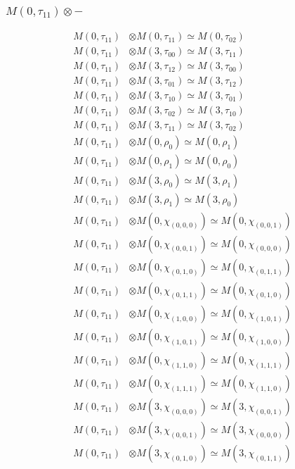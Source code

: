 \subsubsection{$ M(0,\tau_{11})\otimes -$}
\begin{align*}
M(0,\tau_{11}) &\otimes M(0,\tau_{11}) \simeq M(0,\tau_{02}) \\
M(0,\tau_{11}) &\otimes M(3,\tau_{00}) \simeq M(3,\tau_{11}) \\
M(0,\tau_{11}) &\otimes M(3,\tau_{12}) \simeq M(3,\tau_{00}) \\
M(0,\tau_{11}) &\otimes M(3,\tau_{01}) \simeq M(3,\tau_{12}) \\
M(0,\tau_{11}) &\otimes M(3,\tau_{10}) \simeq M(3,\tau_{01}) \\
M(0,\tau_{11}) &\otimes M(3,\tau_{02}) \simeq M(3,\tau_{10}) \\
M(0,\tau_{11}) &\otimes M(3,\tau_{11}) \simeq M(3,\tau_{02}) \\
M(0,\tau_{11}) &\otimes M(0,\rho_{0}) \simeq M(0,\rho_{1}) \\
M(0,\tau_{11}) &\otimes M(0,\rho_{1}) \simeq M(0,\rho_{0}) \\
M(0,\tau_{11}) &\otimes M(3,\rho_{0}) \simeq M(3,\rho_{1}) \\
M(0,\tau_{11}) &\otimes M(3,\rho_{1}) \simeq M(3,\rho_{0}) \\
M(0,\tau_{11}) &\otimes M(0,\chi_{(0,0,0)}) \simeq M(0,\chi_{(0,0,1)}) \\
M(0,\tau_{11}) &\otimes M(0,\chi_{(0,0,1)}) \simeq M(0,\chi_{(0,0,0)}) \\
M(0,\tau_{11}) &\otimes M(0,\chi_{(0,1,0)}) \simeq M(0,\chi_{(0,1,1)}) \\
M(0,\tau_{11}) &\otimes M(0,\chi_{(0,1,1)}) \simeq M(0,\chi_{(0,1,0)}) \\
M(0,\tau_{11}) &\otimes M(0,\chi_{(1,0,0)}) \simeq M(0,\chi_{(1,0,1)}) \\
M(0,\tau_{11}) &\otimes M(0,\chi_{(1,0,1)}) \simeq M(0,\chi_{(1,0,0)}) \\
M(0,\tau_{11}) &\otimes M(0,\chi_{(1,1,0)}) \simeq M(0,\chi_{(1,1,1)}) \\
M(0,\tau_{11}) &\otimes M(0,\chi_{(1,1,1)}) \simeq M(0,\chi_{(1,1,0)}) \\
M(0,\tau_{11}) &\otimes M(3,\chi_{(0,0,0)}) \simeq M(3,\chi_{(0,0,1)}) \\
M(0,\tau_{11}) &\otimes M(3,\chi_{(0,0,1)}) \simeq M(3,\chi_{(0,0,0)}) \\
M(0,\tau_{11}) &\otimes M(3,\chi_{(0,1,0)}) \simeq M(3,\chi_{(0,1,1)}) \\

\end{align*}
